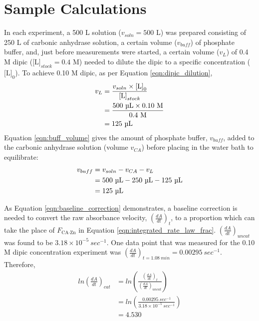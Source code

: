 \section{Sample Calculations}
In each experiment, a 500 {\textmu}L solution ($v_{soln}=500$ {\textmu}L) was prepared consisting of 250 {\textmu}L of carbonic anhydrase solution, a certain volume ($v_{buff}$) of phosphate buffer, and, just before measurements were started, a certain volume ($v_{L}$) of 0.4 M dipic ($\text{[L]}_{stock}=0.4$ M) needed to dilute the dipic to a specific concentration ($\text{[L]}_0$). To achieve 0.10 M dipic, as per Equation \eqref{eqn:dipic_dilution},
\begin{equation*}
\begin{split}
v_L&=\frac{v_{soln} \times \text{[L]}_0}{\text{[L]}_{stock}}\\
&=\frac{500\text{ {\textmu}L} \times 0.10\text{ M}}{0.4\text{ M}}\\
&=125\text{ {\textmu}L}
\end{split}
\end{equation*}
Equation \eqref{eqn:buff_volume} gives the amount of phosphate buffer, $v_{buff}$, added to the carbonic anhydrase solution (volume $v_{CA}$) before placing in the water bath to equilibrate:
\begin{equation*}
\begin{split}
v_{buff}&=v_{soln}-v_{CA}-v_L\\
&=500\text{ {\textmu}L}-250\text{ {\textmu}L}-125\text{ {\textmu}L}\\
&=125\text{ {\textmu}L}
\end{split}
\end{equation*}

As Equation \eqref{eqn:baseline_correction} demonstrates, a baseline correction is needed to convert the raw absorbance velocity, $\left(\frac{dA}{dt}\right)_{t}$, to a proportion which can take the place of $F_\text{CA$\cdot$Zn}$ in Equation \eqref{eqn:integrated_rate_law_frac}. $\left(\frac{dA}{dt}\right)_{uncat}$ was found to be $3.18\times10^{-5}\ sec^{-1}$. One data point that was measured for the 0.10 M dipic concentration experiment was $\left(\frac{dA}{dt}\right)_{t=1.08\ min}=0.00295\ sec^{-1}$. Therefore,
\begin{equation*}
\begin{split}
ln \left(\frac{dA}{dt}\right)_{cat}
&= ln \left( \frac{ \left (\frac{dA}{dt}\right)_{t} }{ \left (\frac{dA}{dt}\right)_{uncat} } \right) \\
&= ln \left( \frac{ 0.00295\ sec^{-1} }{ 3.18\times10^{-5}\ sec^{-1} } \right) \\
&= 4.530
\end{split}
\end{equation*}

